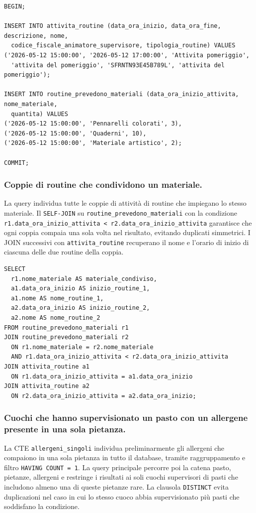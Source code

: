 \documentclass[11pt,a4paper]{article}
\begin{document}
\begin{verbatim}
BEGIN;

INSERT INTO attivita_routine (data_ora_inizio, data_ora_fine, descrizione, nome,
  codice_fiscale_animatore_supervisore, tipologia_routine) VALUES
('2026-05-12 15:00:00', '2026-05-12 17:00:00', 'Attivita pomeriggio',
  'attivita del pomeriggio', 'SFRNTN93E45B789L', 'attivita del pomeriggio');

INSERT INTO routine_prevedono_materiali (data_ora_inizio_attivita, nome_materiale,
  quantita) VALUES
('2026-05-12 15:00:00', 'Pennarelli colorati', 3),
('2026-05-12 15:00:00', 'Quaderni', 10),
('2026-05-12 15:00:00', 'Materiale artistico', 2);

COMMIT;
\end{verbatim}

\subsubsection{Coppie di routine che condividono un materiale.}
La query individua tutte le coppie di attività di routine che impiegano lo stesso materiale. Il
\texttt{SELF-JOIN} su \texttt{routine\_prevedono\_materiali} con la condizione
\texttt{r1.data\_ora\_inizio\_attivita < r2.data\_ora\_inizio\_attivita} garantisce che ogni
coppia compaia una sola volta nel risultato, evitando duplicati simmetrici. I JOIN successivi con
\texttt{attivita\_routine} recuperano il nome e l'orario di inizio di ciascuna delle due routine
della coppia.

\begin{verbatim}
SELECT
  r1.nome_materiale AS materiale_condiviso,
  a1.data_ora_inizio AS inizio_routine_1,
  a1.nome AS nome_routine_1,
  a2.data_ora_inizio AS inizio_routine_2,
  a2.nome AS nome_routine_2
FROM routine_prevedono_materiali r1
JOIN routine_prevedono_materiali r2
  ON r1.nome_materiale = r2.nome_materiale
  AND r1.data_ora_inizio_attivita < r2.data_ora_inizio_attivita
JOIN attivita_routine a1
  ON r1.data_ora_inizio_attivita = a1.data_ora_inizio
JOIN attivita_routine a2
  ON r2.data_ora_inizio_attivita = a2.data_ora_inizio;
\end{verbatim}

\subsubsection{Cuochi che hanno supervisionato un pasto con un allergene presente in una sola pietanza.}
La CTE \texttt{allergeni\_singoli} individua preliminarmente gli allergeni che compaiono in una
sola pietanza in tutto il database, tramite raggruppamento e filtro \texttt{HAVING COUNT = 1}.
La query principale percorre poi la catena pasto, pietanze, allergeni e restringe i risultati ai
soli cuochi supervisori di pasti che includono almeno una di queste pietanze rare. La clausola
\texttt{DISTINCT} evita duplicazioni nel caso in cui lo stesso cuoco abbia supervisionato più
pasti che soddisfano la condizione.
\end{document}
